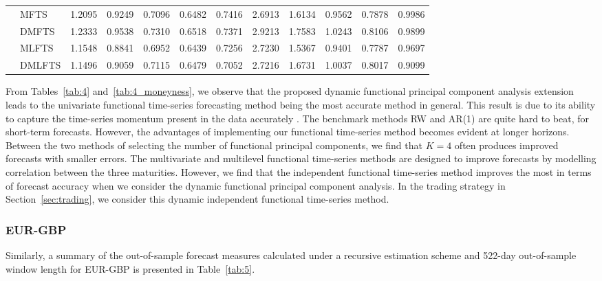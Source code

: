\documentclass[12pt,a4paper]{article}
\begin{document}
\begin{center}
\begin{small}
\begin{longtable}{@{}llrrrrrrrrrr@{}}
  & MFTS & 1.2095 & 0.9249 & 0.7096 & 0.6482 & 0.7416 & 2.6913 & 1.6134 & 0.9562 & 0.7878 & 0.9986 \\ 
  & DMFTS & 1.2333 & 0.9538 & 0.7310 & 0.6518 & 0.7371 & 2.9213 & 1.7583 & 1.0243 & 0.8106 & 0.9899 \\ 
  & MLFTS & 1.1548 & 0.8841 & 0.6952 & 0.6439 & 0.7256 & 2.7230 & 1.5367 & 0.9401 & 0.7787 & 0.9697 \\ 
  & DMLFTS & 1.1496 & 0.9059 & 0.7115 & 0.6479 & 0.7052 & 2.7216 & 1.6731 & 1.0037 & 0.8017 & 0.9099 \\ 
  \bottomrule
\end{longtable}
\end{small}
\end{center}

From Tables~\ref{tab:4} and~\ref{tab:4_moneyness}, we observe that the proposed dynamic functional principal component analysis extension leads to the univariate functional time-series forecasting method being the most accurate method in general. This result is due to its ability to capture the time-series momentum present in the data accurately \citep[see also][]{MGG20}. The benchmark methods RW and AR(1) are quite hard to beat, for short-term forecasts. However, the advantages of implementing our functional time-series method becomes evident at longer horizons. Between the two methods of selecting the number of functional principal components, we find that $K=4$ often produces improved forecasts with smaller errors. The multivariate and multilevel functional time-series methods are designed to improve forecasts by modelling correlation between the three maturities. However, we find that the independent functional time-series method improves the most in terms of forecast accuracy when we consider the dynamic functional principal component analysis. In the trading strategy in Section~\ref{sec:trading}, we consider this dynamic independent functional time-series method.

\subsubsection{EUR-GBP}

Similarly, a summary of the out-of-sample forecast measures calculated under a recursive estimation scheme and 522-day out-of-sample window length for EUR-GBP is presented in Table~\ref{tab:5}.
\end{document}
